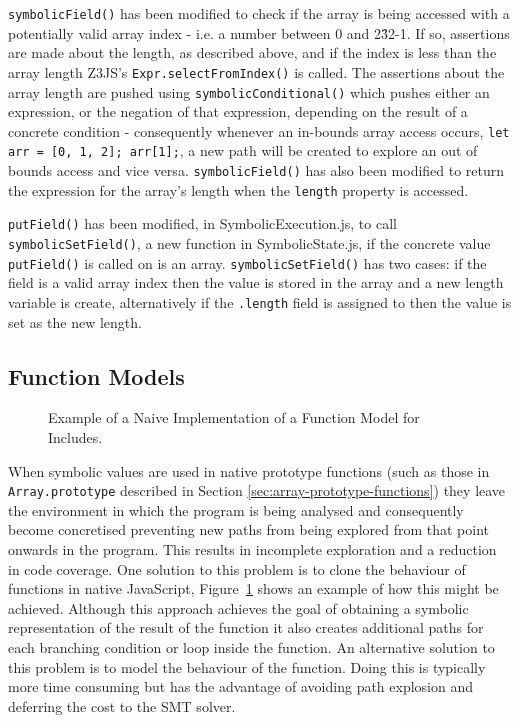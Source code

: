 \documentclass[]{final_report}
\begin{document}
\lstinline{symbolicField()} has been modified to check if the array is being accessed with a potentially valid array index - i.e. a number between 0 and 2\^32-1. If so, assertions are made about the length, as described above, and if the index is less than the array length Z3JS’s \lstinline{Expr.selectFromIndex()} is called. The assertions about the array length are pushed using \lstinline{symbolicConditional()} which pushes either an expression, or the negation of that expression, depending on the result of a concrete condition - consequently whenever an in-bounds array access occurs, \lstinline{let arr = [0, 1, 2]; arr[1];}, a new path will be created to explore an out of bounds access and vice versa. \lstinline{symbolicField()} has also been modified to return the expression for the array's length when the \lstinline{length} property is accessed.

\lstinline|putField()| has been modified, in SymbolicExecution.js, to call \lstinline|symbolicSetField()|, a new function in SymbolicState.js, if the concrete value \lstinline|putField()| is called on is an array. \lstinline|symbolicSetField()| has two cases: if the field is a valid array index then the value is stored in the array and a new length variable is create, alternatively if the \lstinline|.length| field is assigned to then the value is set as the new length.

\subsection{Function Models}
\begin{figure}[t]

\caption{\label{fig:naive-includes} Example of a Naive Implementation of a Function Model for Includes.}
\end{figure}

When symbolic values are used in native prototype functions (such as those in \lstinline{Array.prototype} described in Section \ref{sec:array-prototype-functions}) they leave the environment in which the program is being analysed and consequently become concretised preventing new paths from being explored from that point onwards in the program. This results in incomplete exploration and a reduction in code coverage. One solution to this problem is to clone the behaviour of functions in native JavaScript, Figure~\ref{fig:naive-includes} shows an example of how this might be achieved. Although this approach achieves the goal of obtaining a symbolic representation of the result of the function it also creates additional paths for each branching condition or loop inside the function. An alternative solution to this problem is to model the behaviour of the function. Doing this is typically more time consuming but has the advantage of avoiding path explosion and deferring the cost to the SMT solver.
\end{document}
